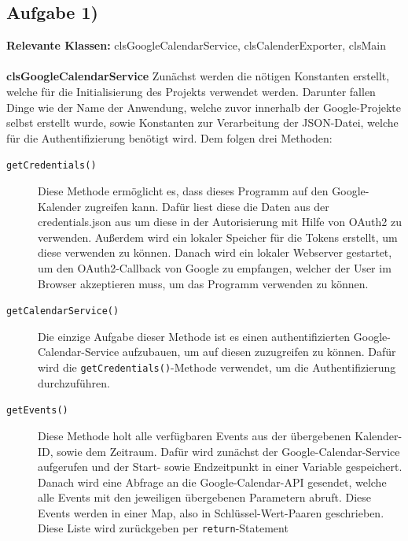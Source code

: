 \documentclass[a4paper]{article}
\begin{document}
	\subsection{Aufgabe 1)}
	\textbf{Relevante Klassen:} clsGoogleCalendarService, clsCalenderExporter, clsMain  
	\\
	\\
	\textbf{clsGoogleCalendarService} Zunächst werden die nötigen Konstanten erstellt, welche für die Initialisierung des Projekts verwendet werden. Darunter fallen Dinge wie der Name der Anwendung, welche zuvor innerhalb der Google-Projekte selbst erstellt wurde, sowie Konstanten zur Verarbeitung der JSON-Datei, welche für die Authentifizierung benötigt wird.
	Dem folgen drei Methoden:
	\begin{description}
		
		\item[\texttt{getCredentials()}] Diese Methode ermöglicht es, dass dieses Programm auf den Google-Kalender zugreifen kann. Dafür liest diese die Daten aus der credentials.json aus um diese in der Autorisierung mit Hilfe von OAuth2 zu verwenden. Außerdem wird ein lokaler Speicher für die Tokens erstellt, um diese verwenden zu können. Danach wird ein lokaler Webserver gestartet, um den OAuth2-Callback von Google zu empfangen, welcher der User im Browser akzeptieren muss, um das Programm verwenden zu können.
		
		\item[\texttt{getCalendarService()}] Die einzige Aufgabe dieser Methode ist es einen authentifizierten Google-Calendar-Service aufzubauen, um auf diesen zuzugreifen zu können. Dafür wird die \texttt{getCredentials()}-Methode verwendet, um die Authentifizierung durchzuführen.
		
		\item[\texttt{getEvents()}] Diese Methode holt alle verfügbaren Events aus der übergebenen Kalender-ID, sowie dem Zeitraum. Dafür wird zunächst der Google-Calendar-Service aufgerufen und der Start- sowie Endzeitpunkt in einer Variable gespeichert.
		Danach wird eine Abfrage an die Google-Calendar-API gesendet, welche alle Events mit den jeweiligen übergebenen Parametern abruft. Diese Events werden in einer Map, also in Schlüssel-Wert-Paaren geschrieben. Diese Liste wird zurückgeben per \texttt{return}-Statement
	\end{description}
	
\end{document}
